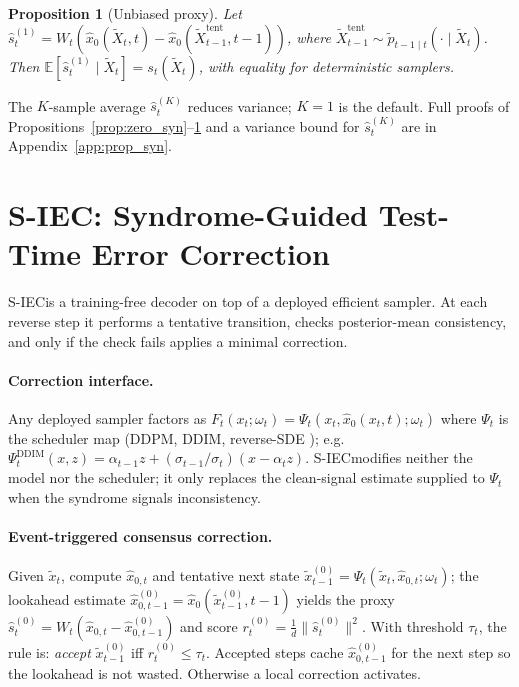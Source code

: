 \documentclass{article}
\theoremstyle{plain}
\newtheorem{proposition}[theorem]{Proposition}
\theoremstyle{definition}
\theoremstyle{remark}
\newcommand{\SIEC}{\texorpdfstring{S\mbox{-}IEC\xspace}{S-IEC }}
\begin{document}
\begin{proposition}[Unbiased proxy]\label{prop:proxy}
Let \(\hat s_t^{(1)} = W_t(\hat x_0(\tilde X_t,t) - \hat x_0(\tilde
X_{t-1}^{\mathrm{tent}}, t-1))\), where \(\tilde X_{t-1}^{\mathrm{tent}}
\sim \tilde p_{t-1\mid t}(\cdot \mid \tilde X_t)\). Then
\(\mathbb{E}[\hat s_t^{(1)} \mid \tilde X_t] = s_t(\tilde X_t)\), with
equality for deterministic samplers.
\end{proposition}

The \(K\)-sample average \(\hat s_t^{(K)}\) reduces variance; \(K=1\) is
the default. Full proofs of Propositions~\ref{prop:zero_syn}--\ref{prop:proxy}
and a variance bound for \(\hat s_t^{(K)}\) are in
Appendix~\ref{app:prop_syn}.

\section{S-IEC: Syndrome-Guided Test-Time Error Correction}
\label{sec:method}

\SIEC is a training-free decoder on top of a deployed efficient sampler. At
each reverse step it performs a tentative transition, checks posterior-mean
consistency, and only if the check fails applies a minimal correction.

\paragraph{Correction interface.}
Any deployed sampler factors as \(F_t(x_t;\omega_t) = \Psi_t(x_t, \hat
x_0(x_t,t);\omega_t)\) where \(\Psi_t\) is the scheduler map (DDPM, DDIM,
reverse-SDE \citep{ho2020ddpm,song2021ddim,song2021sde}); e.g.\
\(\Psi_t^{\mathrm{DDIM}}(x,z) = \alpha_{t-1} z +
(\sigma_{t-1}/\sigma_t)(x-\alpha_t z)\). \SIEC modifies neither the model
nor the scheduler; it only replaces the clean-signal estimate supplied to
\(\Psi_t\) when the syndrome signals inconsistency.

\paragraph{Event-triggered consensus correction.}
Given \(\tilde x_t\), compute \(\hat x_{0,t}\) and tentative next state
\(\tilde x_{t-1}^{(0)} = \Psi_t(\tilde x_t,\hat x_{0,t};\omega_t)\); the
lookahead estimate \(\hat x_{0,t-1}^{(0)} = \hat x_0(\tilde
x_{t-1}^{(0)},t-1)\) yields the proxy \(\hat s_t^{(0)} = W_t(\hat x_{0,t} -
\hat x_{0,t-1}^{(0)})\) and score \(r_t^{(0)} = \tfrac1d \|\hat s_t^{(0)}\|^2\).
With threshold \(\tau_t\), the rule is: \emph{accept} \(\tilde x_{t-1}^{(0)}\)
iff \(r_t^{(0)} \le \tau_t\). Accepted steps cache \(\hat x_{0,t-1}^{(0)}\)
for the next step so the lookahead is not wasted. Otherwise a local correction
activates.
\end{document}
